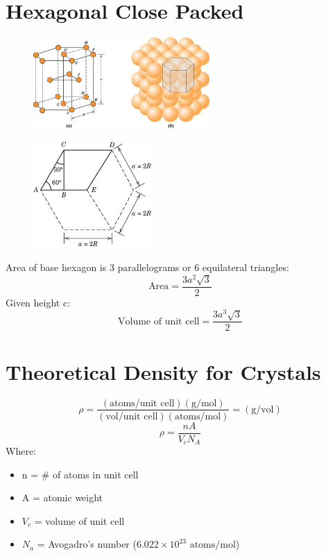 \documentclass[12pt]{article}
\begin{document}
\section*{Hexagonal Close Packed}
\begin{figure}[H]
    \centering
    \includegraphics[width=0.6\textwidth]{HCP.jpg}
\end{figure}
\begin{figure}[H]
    \centering
    \includegraphics[width=0.4\textwidth]{Untitled.jpg}
\end{figure}
Area of base hexagon is 3 parallelograms or 6 equilateral triangles:
\[\text{Area}=\frac{3a^2\sqrt{3}}{2}\]
Given height c:
\[\text{Volume of unit cell}=\frac{3a^3\sqrt{3}}{2}\]
\newpage
\section*{Theoretical Density for Crystals}
\[\rho=\frac{(\text{atoms/unit cell})(\text{g/mol})}{(\text{vol/unit cell})(\text{atoms/mol})}=(\text{g/vol})\]
\[\rho=\frac{nA}{V_c N_A}\]
Where:
\begin{itemize}
    \item n = \# of atoms in unit cell
    \item A = atomic weight
    \item $V_c$ = volume of unit cell
    \item $N_a$ = Avogadro's number ($6.022 \times 10^{23 }\text{ atoms/mol}$)
\end{itemize}
\end{document}
